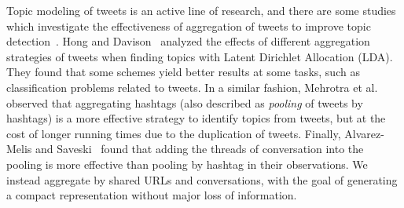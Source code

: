 Topic modeling of tweets is an active line of research, and there are some
studies which investigate the effectiveness of aggregation of tweets to improve
topic
detection~\cite{Hong:2010:EST:1964858.1964870,Mehrotra:2013:ILT:2484028.2484166,alvarez2016topic}.
Hong and Davison~\cite{Hong:2010:EST:1964858.1964870} analyzed the effects of
different aggregation strategies of tweets when finding topics with Latent
Dirichlet Allocation (LDA). 
%
They found that some schemes yield better results at some tasks, such as
classification problems related to tweets. 
%
In a similar fashion, Mehrotra et al.~\cite{Mehrotra:2013:ILT:2484028.2484166}
observed that aggregating hashtags (also described as {\em pooling} of tweets by
hashtags) is a more effective strategy to identify topics from tweets, but at
the cost of longer running times due to the duplication of tweets. 
%
Finally, Alvarez-Melis and Saveski~\cite{alvarez2016topic} found that adding the
threads of conversation into the pooling is more effective than pooling by
hashtag in their observations. 
%
We instead aggregate by shared URLs and conversations, with the goal of
generating a compact representation without major loss of information.




